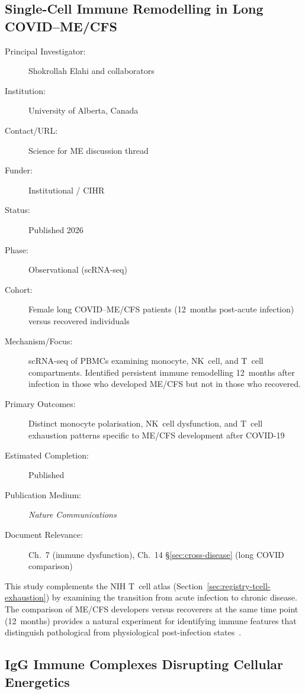 \subsection{Single-Cell Immune Remodelling in Long COVID--ME/CFS}
\label{sec:registry-elahi-singlecell}

\begin{description}
    \item[Principal Investigator:] Shokrollah Elahi and collaborators
    \item[Institution:] University of Alberta, Canada
    \item[Contact/URL:] Science for ME discussion thread
    \item[Funder:] Institutional / CIHR
    \item[Status:] Published 2026
    \item[Phase:] Observational (scRNA-seq)
    \item[Cohort:] Female long COVID--ME/CFS patients (12~months post-acute
        infection) versus recovered individuals
    \item[Mechanism/Focus:] scRNA-seq of PBMCs examining monocyte, NK~cell,
        and T~cell compartments.  Identified persistent immune remodelling
        12~months after infection in those who developed ME/CFS but not in
        those who recovered.
    \item[Primary Outcomes:] Distinct monocyte polarisation, NK~cell
        dysfunction, and T~cell exhaustion patterns specific to ME/CFS
        development after COVID-19
    \item[Estimated Completion:] Published
    \item[Publication Medium:] \textit{Nature Communications}
    \item[Document Relevance:] Ch.~7 (immune dysfunction), Ch.~14
        \S\ref{sec:cross-disease} (long COVID comparison)
\end{description}

This study complements the NIH T~cell atlas
(Section~\ref{sec:registry-tcell-exhaustion}) by examining the transition
from acute infection to chronic disease.  The comparison of ME/CFS
developers versus recoverers at the same time point (12~months) provides a
natural experiment for identifying immune features that distinguish
pathological from physiological post-infection states~\cite{Elahi2026singlecell}.

\subsection{IgG Immune Complexes Disrupting Cellular Energetics}
\label{sec:registry-igg-complexes}

